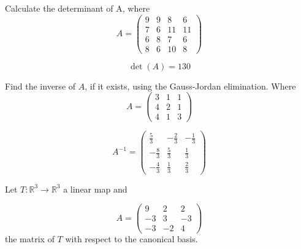 \begin{questions}

\question Calculate the determinant of A, where
$$
A=\left(\begin{array}{rrrr}
9 & 9 & 8 & 6 \\
7 & 6 & 11 & 11 \\
6 & 8 & 7 & 6 \\
8 & 6 & 10 & 8
\end{array}\right)
$$

\begin{solution}
$$\det(A)=130$$
\end{solution}

\question Find the inverse of $A$, if it exists, using the Gauss-Jordan elimination. Where
$$
A=\left(\begin{array}{rrr}
3 & 1 & 1 \\
4 & 2 & 1 \\
4 & 1 & 3
\end{array}\right)
$$

\begin{solution}
$$A^{-1}=\left(\begin{array}{rrr}
\frac{5}{3} & -\frac{2}{3} & -\frac{1}{3} \\
-\frac{8}{3} & \frac{5}{3} & \frac{1}{3} \\
-\frac{4}{3} & \frac{1}{3} & \frac{2}{3}
\end{array}\right)$$
\end{solution}

\question Let $T:\mathbb{R}^3\rightarrow\mathbb{R}^3$  a linear map and
 
$$
A=\left(\begin{array}{rrr}
9 & 2 & 2 \\
-3 & 3 & -3 \\
-3 & -2 & 4
\end{array}\right)
$$
the matrix of $T$ with respect to the canonical basis.
\end{questions}
